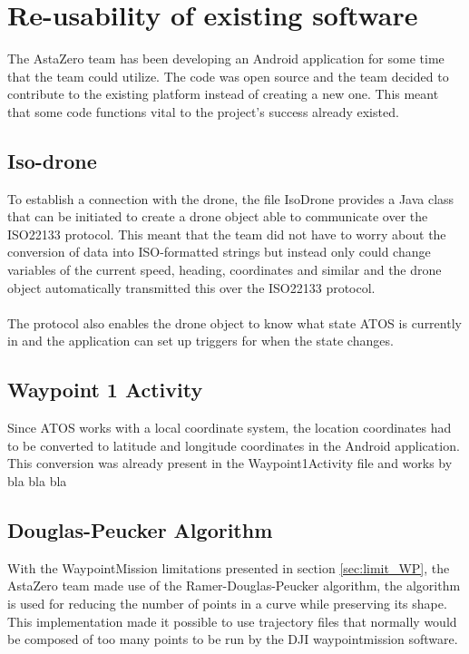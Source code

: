 \section{Re-usability of existing software}
The AstaZero team has been developing an Android application for some time that the team could utilize. The code was open source and the team decided to contribute to the existing platform instead of creating a new one. This meant that some code functions vital to the project's success already existed.

\subsection{Iso-drone}
To establish a connection with the drone, the file IsoDrone provides a Java class that can be initiated to create a drone object able to communicate over the ISO22133 protocol. This meant that the team did not have to worry about the conversion of data into ISO-formatted strings but instead only could change variables of the current speed, heading, coordinates and similar and the drone object automatically transmitted this over the ISO22133 protocol. 
\\ \\
The protocol also enables the drone object to know what state ATOS is currently in and the application can set up triggers for when the state changes.

\subsection{Waypoint 1 Activity}
Since ATOS works with a local coordinate system, the location coordinates had to be converted to latitude and longitude coordinates in the Android application. This conversion was already present in the Waypoint1Activity file and works by bla bla bla  

\subsection{Douglas-Peucker Algorithm}
With the WaypointMission limitations presented in section \ref{sec:limit_WP}, the AstaZero team made use of the Ramer-Douglas-Peucker algorithm, the algorithm is used for reducing the number of points in a curve while preserving its shape. %
This implementation made it possible to use trajectory files that normally would be composed of too many points to be run by the DJI waypointmission software. \\  

